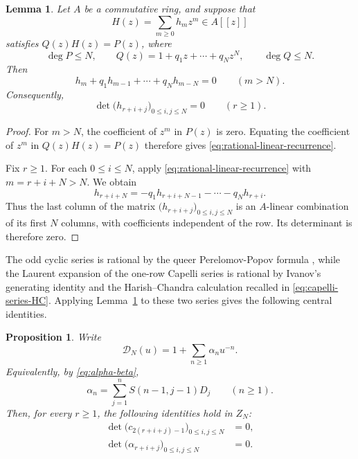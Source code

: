 \documentclass[11pt]{amsart}
\numberwithin{equation}{section}
\newtheorem{proposition}[theorem]{Proposition}
\newtheorem{lemma}[theorem]{Lemma}
\theoremstyle{definition}
\theoremstyle{remark}
\newcommand{\calD}{\mathcal D}
\begin{document}
\begin{lemma}
\label{lem:rational-hankel}
Let \(A\) be a commutative ring, and suppose that
\[
 H(z)=\sum_{m\geq0}h_mz^m\in A[[z]]
\]
satisfies \(Q(z)H(z)=P(z)\), where
\[
 \deg P\leq N,
 \qquad
 Q(z)=1+q_1z+\cdots+q_Nz^N,
 \qquad
 \deg Q\leq N.
\]
Then
\begin{equation}
 h_m+q_1h_{m-1}+\cdots+q_Nh_{m-N}=0
 \qquad(m>N).
 \label{eq:rational-linear-recurrence}
\end{equation}
Consequently,
\begin{equation}
 \det\bigl(h_{r+i+j}\bigr)_{0\leq i,j\leq N}=0
 \qquad(r\geq1).
 \label{eq:abstract-hankel-vanishing}
\end{equation}
\end{lemma}

\begin{proof}
For \(m>N\), the coefficient of \(z^m\) in \(P(z)\) is zero.
Equating the coefficient of \(z^m\) in \(Q(z)H(z)=P(z)\) therefore
gives \eqref{eq:rational-linear-recurrence}.

Fix \(r\geq1\).  For each \(0\leq i\leq N\), apply
\eqref{eq:rational-linear-recurrence} with \(m=r+i+N>N\).  We obtain
\[
 h_{r+i+N}
 =-q_1h_{r+i+N-1}-\cdots-q_Nh_{r+i}.
\]
Thus the last column of the matrix
\(\bigl(h_{r+i+j}\bigr)_{0\leq i,j\leq N}\) is an
\(A\)-linear combination of its first \(N\) columns, with coefficients
independent of the row.  Its determinant is therefore zero.
\end{proof}

The odd cyclic series is rational by the queer Perelomov-Popov formula
\cite[Sec.~2.2]{GN2019}, while the Laurent expansion of the one-row
Capelli series is rational by Ivanov's generating identity
\cite[Cor.~8.3]{Ivanov2005} and the Harish--Chandra calculation recalled
in \eqref{eq:capelli-series-HC}.  Applying
Lemma~\ref{lem:rational-hankel} to these two series gives the following
central identities.

\begin{proposition}
\label{prop:finite-rank-hankel}
Write
\[
 \calD_N(u)=1+\sum_{n\geq1}\alpha_nu^{-n}.
\]
Equivalently, by \eqref{eq:alpha-beta},
\[
 \alpha_n=\sum_{j=1}^n S(n-1,j-1)D_j
 \qquad(n\geq1).
\]
Then, for every \(r\geq1\), the following identities hold in \(Z_N\):
\begin{align}
 \det\bigl(c_{2(r+i+j)-1}\bigr)_{0\leq i,j\leq N}&=0,
 \label{eq:cyclic-hankel}\\
 \det\bigl(\alpha_{r+i+j}\bigr)_{0\leq i,j\leq N}&=0.
 \label{eq:Capelli-hankel}
\end{align}
\end{proposition}
\end{document}
